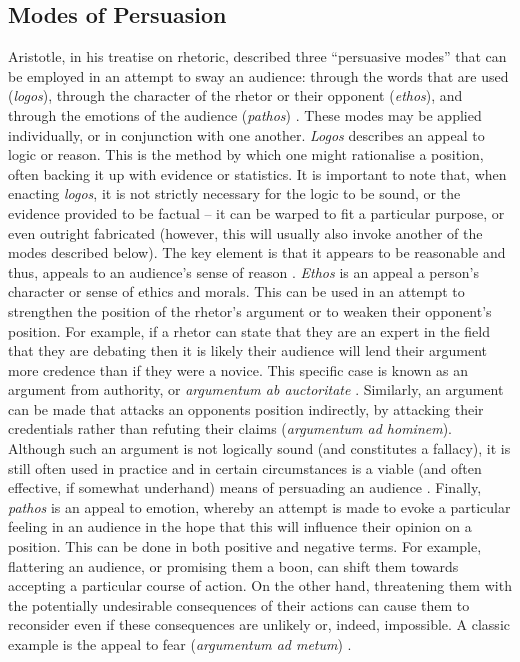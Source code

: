 \subsection{Modes of Persuasion}
Aristotle, in his treatise on rhetoric, described three ``persuasive modes'' that can be employed in an attempt to sway an audience: through the words that are used (\textit{logos}), through the character of the rhetor or their opponent (\textit{ethos}), and through the emotions of the audience (\textit{pathos}) \citep{Kennedy1991}. These modes may be applied individually, or in conjunction with one another. \textit{Logos} describes an appeal to logic or reason. This is the method by which one might rationalise a position, often backing it up with evidence or statistics. It is important to note that, when enacting \textit{logos}, it is not strictly necessary for the logic to be sound, or the evidence provided to be factual -- it can be warped to fit a particular purpose, or even outright fabricated (however, this will usually also invoke another of the modes described below). The key element is that it appears to be reasonable and thus, appeals to an audience's sense of reason \citep{Kennedy1991, Braet1992}. \textit{Ethos} is an appeal a person's character or sense of ethics and morals. This can be used in an attempt to strengthen the position of the rhetor's argument or to weaken their opponent's position. For example, if a rhetor can state that they are an expert in the field that they are debating then it is likely their audience will lend their argument more credence than if they were a novice. This specific case is known as an argument from authority, or \textit{argumentum ab auctoritate} \citep{Kennedy1991, Braet1992}. Similarly, an argument can be made that attacks an opponents position indirectly, by attacking their credentials rather than refuting their claims (\textit{argumentum ad hominem}). Although such an argument is not logically sound (and constitutes a fallacy), it is still often used in practice and in certain circumstances is a viable (and often effective, if somewhat underhand) means of persuading an audience \citep{walton1987, Budzynska2012}. Finally, \textit{pathos} is an appeal to emotion, whereby an attempt is made to evoke a particular feeling in an audience in the hope that this will influence their opinion on a position. This can be done in both positive and negative terms. For example, flattering an audience, or promising them a boon, can shift them towards accepting a particular course of action. On the other hand, threatening them with the potentially undesirable consequences of their actions can cause them to reconsider even if these consequences are unlikely or, indeed, impossible. A classic example is the appeal to fear (\textit{argumentum ad metum}) \citep{Kennedy1991, Braet1992}.


